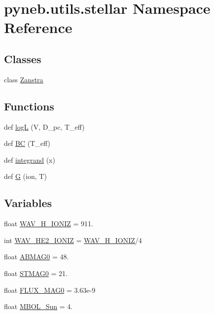 \hypertarget{namespacepyneb_1_1utils_1_1stellar}{}\section{pyneb.\+utils.\+stellar Namespace Reference}
\label{namespacepyneb_1_1utils_1_1stellar}
\subsection*{Classes}
\begin{DoxyCompactItemize}
\item 
class \hyperlink{classpyneb_1_1utils_1_1stellar_1_1_zanstra}{Zanstra}
\end{DoxyCompactItemize}
\subsection*{Functions}
\begin{DoxyCompactItemize}
\item 
def \hyperlink{namespacepyneb_1_1utils_1_1stellar_ac8707dcb0395c96cc4053e1f46f2c02f}{log\+L} (V, D\+\_\+pc, T\+\_\+eff)
\item 
def \hyperlink{namespacepyneb_1_1utils_1_1stellar_a6a17bb8af2c6325b342af54c660d9aab}{B\+C} (T\+\_\+eff)
\item 
def \hyperlink{namespacepyneb_1_1utils_1_1stellar_a46d2fd9e00f4e0605c2e8c72b904d532}{integrand} (x)
\item 
def \hyperlink{namespacepyneb_1_1utils_1_1stellar_a8a89c2764d0517d414e8da6c2031d601}{G} (ion, T)
\end{DoxyCompactItemize}
\subsection*{Variables}
\begin{DoxyCompactItemize}
\item 
float \hyperlink{namespacepyneb_1_1utils_1_1stellar_a3b08012da140f22a1eae2f67e76e4fcb}{W\+A\+V\+\_\+\+H\+\_\+\+I\+O\+N\+I\+Z} = 911.
\item 
int \hyperlink{namespacepyneb_1_1utils_1_1stellar_a1a835c0f9e5358c4429341c9dde6136a}{W\+A\+V\+\_\+\+H\+E2\+\_\+\+I\+O\+N\+I\+Z} = \hyperlink{namespacepyneb_1_1utils_1_1stellar_a3b08012da140f22a1eae2f67e76e4fcb}{W\+A\+V\+\_\+\+H\+\_\+\+I\+O\+N\+I\+Z}/4
\item 
float \hyperlink{namespacepyneb_1_1utils_1_1stellar_a0ea378d70a17ed2cc96e376adb38d088}{A\+B\+M\+A\+G0} = 48.
\item 
float \hyperlink{namespacepyneb_1_1utils_1_1stellar_ad1eff0010bbf25e2217f1e032b977776}{S\+T\+M\+A\+G0} = 21.
\item 
float \hyperlink{namespacepyneb_1_1utils_1_1stellar_a0354ae64b0e6f25abe4a2885eb1a4e8e}{F\+L\+U\+X\+\_\+\+M\+A\+G0} = 3.\+63e-\/9
\item 
float \hyperlink{namespacepyneb_1_1utils_1_1stellar_ab18debf6c3703f938553e9fcc2211532}{M\+B\+O\+L\+\_\+\+Sun} = 4.
\end{DoxyCompactItemize}


